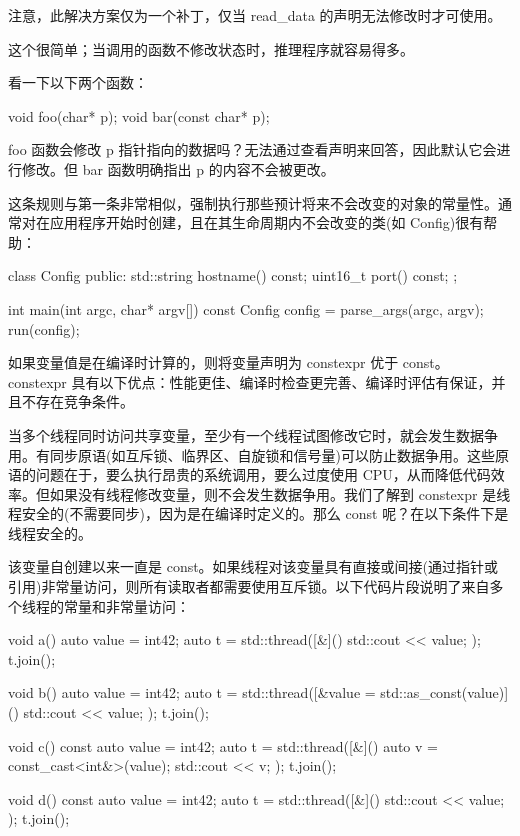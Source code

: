 注意，此解决方案仅为一个补丁，仅当 read\_data 的声明无法修改时才可使用。


这个很简单；当调用的函数不修改状态时，推理程序就容易得多。

看一下以下两个函数：

\begin{cpp}
void foo(char* p);
void bar(const char* p);
\end{cpp}

foo 函数会修改 p 指针指向的数据吗？无法通过查看声明来回答，因此默认它会进行修改。但 bar 函数明确指出 p 的内容不会被更改。


这条规则与第一条非常相似，强制执行那些预计将来不会改变的对象的常量性。通常对在应用程序开始时创建，且在其生命周期内不会改变的类(如 Config)很有帮助：

\begin{cpp}
class Config {
public:
    std::string hostname() const;
    uint16_t port() const;
};

int main(int argc, char* argv[]) {
    const Config config = parse_args(argc, argv);
    run(config);
}
\end{cpp}


如果变量值是在编译时计算的，则将变量声明为 constexpr 优于 const。 constexpr 具有以下优点：性能更佳、编译时检查更完善、编译时评估有保证，并且不存在竞争条件。


当多个线程同时访问共享变量，至少有一个线程试图修改它时，就会发生数据争用。有同步原语(如互斥锁、临界区、自旋锁和信号量)可以防止数据争用。这些原语的问题在于，要么执行昂贵的系统调用，要么过度使用 CPU，从而降低代码效率。但如果没有线程修改变量，则不会发生数据争用。我们了解到 constexpr 是线程安全的(不需要同步)，因为是在编译时定义的。那么 const 呢？在以下条件下是线程安全的。

该变量自创建以来一直是 const。如果线程对该变量具有直接或间接(通过指针或引用)非常量访问，则所有读取者都需要使用互斥锁。以下代码片段说明了来自多个线程的常量和非常量访问：

\begin{cpp}
void a() {
    auto value = int{42};
    auto t = std::thread([&]() { std::cout << value; });
    t.join();
}

void b() {
    auto value = int{42};
    auto t = std::thread([&value = std::as_const(value)]() {
        std::cout << value;
    });
    t.join();
}

void c() {
    const auto value = int{42};
    auto t = std::thread([&]() {
        auto v = const_cast<int&>(value);
        std::cout << v;
    });
    t.join();
}

void d() {
    const auto value = int{42};
    auto t = std::thread([&]() { std::cout << value; });
    t.join();
}
\end{cpp}

